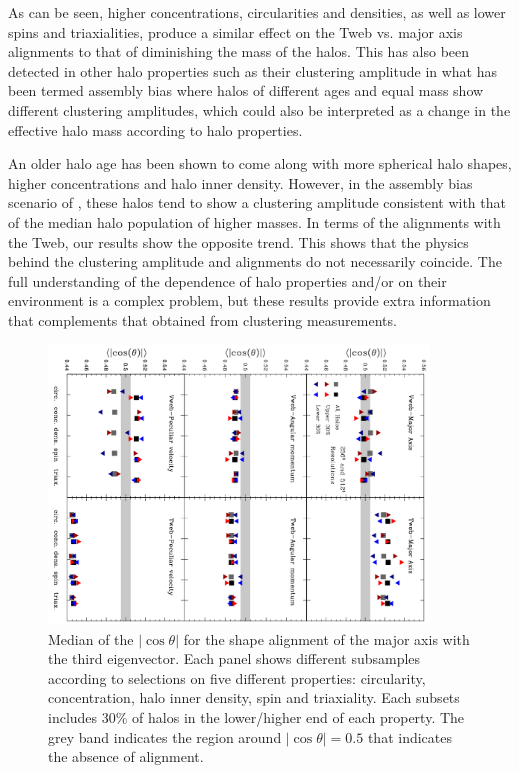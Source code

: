 \documentclass[useAMS,usenatbib]{mn2e}
\begin{document}
As can be seen, higher concentrations, circularities and densities,
as well as lower spins and triaxialities, produce a similar effect on the
Tweb vs. major axis alignments to that of diminishing the mass
of the halos.  This has also been detected in other halo properties such
as their clustering amplitude in what has been termed assembly bias
\citep[e.g.][]{Gao2005,Li2008,Lacerna2011} where halos of different
ages and equal mass show different clustering amplitudes, which could
also be interpreted as a change in the effective halo mass according
to halo properties.

An older halo age has been shown to come along with more spherical halo
shapes, higher concentrations and halo inner density.  However, in the
assembly bias scenario of \cite{Gao2005}, these halos tend to show a clustering
amplitude consistent with that of the median halo population of higher masses.
In terms of the alignments with the Tweb, our results show the opposite
trend.  This shows that the physics behind the clustering amplitude and
alignments do not necessarily coincide.  The full understanding of
the dependence of halo properties and/or on their environment is
a complex problem, but these results provide extra information that complements
that obtained from clustering measurements.


\begin{figure}
\includegraphics[width=0.90\textwidth,angle=90]{Fig6.pdf}
\caption{Median of the $|\cos\theta|$ for the shape alignment of the
  major axis with the third eigenvector. Each panel shows
  different subsamples according to selections on five different
  properties: circularity, concentration, halo inner density, spin and
  triaxiality. Each subsets includes $30\%$ of halos in the lower/higher end of each
  property. The grey band indicates the region around
  $|\cos\theta|=0.5$ that indicates the absence of alignment.}
\label{fig:drive}
\end{figure}
\end{document}
